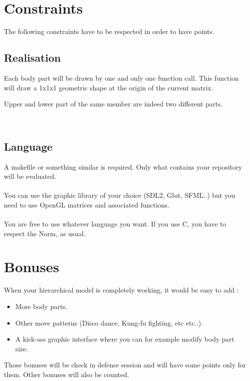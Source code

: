 \documentclass{42}
\begin{document}
\section{Constraints}
	The following constraints have to be respected in order to have points.
\newline
\subsection{Realisation}
	Each body part will be drawn by one and only one function call. This function will draw a 1x1x1 geometric shape at the origin of the current matrix.

\info
{
	Upper and lower part of the same member are indeed two different parts.
}

\
\subsection{Language}
A makefile or something similar is required. Only what contains your repository will be evaluated.\\
\\
\indent You can use the graphic library of your choice (SDL2, Glut, SFML..) but you need to use OpenGL matrices and associated functions.\\
\\
\indent You are free to use whatever language you want. If you use C, you have to respect the Norm, as usual.\\

\newpage
\section{Bonuses}

When your hierarchical model is completely working, it would be easy to add :\\
\begin{itemize}
	\item More body parts.
	\item Other move patterns (Disco dance, Kung-fu fighting, etc etc..).
	\item A kick-ass graphic interface where you can for example modify body part size.
\end{itemize}
\newline
Those bonuses will be check in defense session and will have some points only for them.
Other bonuses will also be counted.\\
\\
\end{document}
